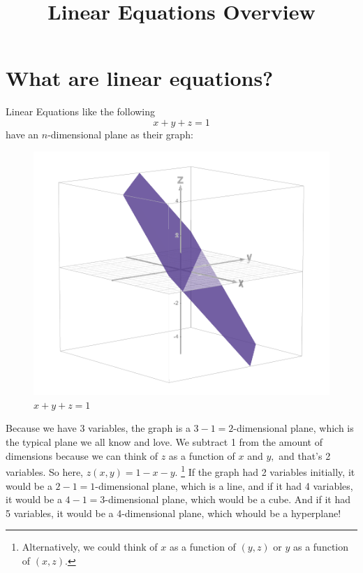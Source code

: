 \documentclass[12pt]{scrartcl}
\title{\vspace{-2em} Linear Equations Overview}
\author{}
\date{}
\begin{document}
\maketitle
\vspace{-6em}

\section*{What are linear equations?}
Linear Equations like the following
\[x + y + z = 1\]
have an $n$-dimensional plane as their graph:
\begin{figure}[H]
    \centering
    \includegraphics[scale=0.6]{x + y + z = 1.png}
    \caption*{$x + y + z = 1$}
\end{figure}
Because we have 3 variables, the graph is a $3-1=2$-dimensional plane, which is the typical plane we all know and love. We subtract 1 from the amount of dimensions because we can think of $z$ as a function of $x$ and $y,$ and that's 2 variables. So here, $z(x,y) = 1 - x - y.$ \footnote{Alternatively, we could think of $x$ as a function of $(y,z)$ or $y$ as a function of $(x,z).$} If the graph had 2 variables initially, it would be a $2-1=1$-dimensional plane, which is a line, and if it had 4 variables, it would be a $4-1=3$-dimensional plane, which would be a cube. And if it had 5 variables, it would be a 4-dimensional plane, which whould be a hyperplane!
\end{document}
